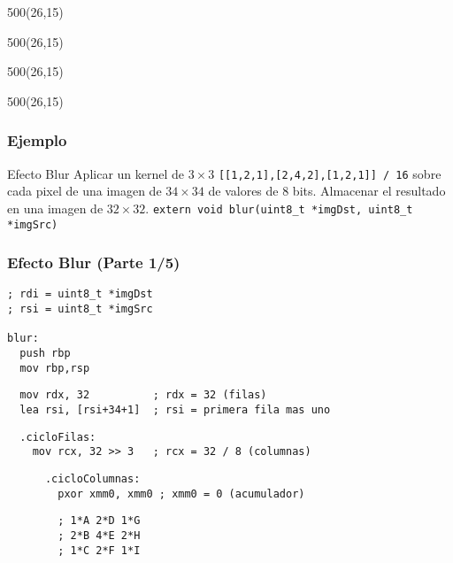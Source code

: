 \documentclass[aspectratio=169]{beamer}
\begin{document}
\begin{frame}[fragile]
    \begin{textblock}{500}(26,15)  \end{textblock} %
    \begin{textblock}{500}(26,15)  \end{textblock} %
    \begin{textblock}{500}(26,15)  \end{textblock} %
    \begin{textblock}{500}(26,15)  \end{textblock} %
\end{frame}

\begin{frame}[fragile]
    \frametitle{Ejemplo}
    \begin{block}{Efecto Blur}
    Aplicar un kernel de $3 \times 3$ \verb|[[1,2,1],[2,4,2],[1,2,1]] / 16| sobre cada pixel de una imagen de $34 \times 34$ de valores de 8 bits. Almacenar el resultado en una imagen de $32 \times 32$.
    \verb|extern void blur(uint8_t *imgDst, uint8_t *imgSrc)|
    \end{block}
\end{frame}

\begin{frame}[fragile]
    \frametitle{Efecto Blur (Parte 1/5)}
    \footnotesize
\begin{verbatim}
; rdi = uint8_t *imgDst
; rsi = uint8_t *imgSrc

blur:
  push rbp
  mov rbp,rsp
\end{verbatim}
\pause
\begin{verbatim}
  mov rdx, 32          ; rdx = 32 (filas)
  lea rsi, [rsi+34+1]  ; rsi = primera fila mas uno
\end{verbatim}
\pause
\begin{verbatim}
  .cicloFilas:
    mov rcx, 32 >> 3   ; rcx = 32 / 8 (columnas)
\end{verbatim}
\pause
\begin{verbatim}
      .cicloColumnas:
        pxor xmm0, xmm0 ; xmm0 = 0 (acumulador)
\end{verbatim}
\pause
\begin{verbatim}
        ; 1*A 2*D 1*G
        ; 2*B 4*E 2*H
        ; 1*C 2*F 1*I
\end{verbatim}
\end{frame}
\end{document}
